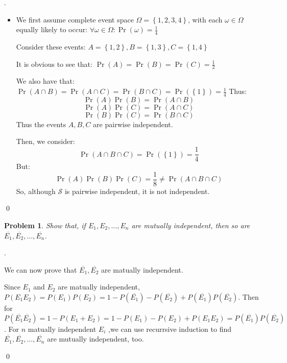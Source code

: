 \documentclass[12pt]{article}
\newtheorem{hw}{Problem}
\newenvironment{sol}
  {\par\vspace{3mm}\noindent{\it Solution}.}
  {\qed}
\begin{document}
\begin{sol}\par
\renewcommand{\qedsymbol}{}
\begin{itemize}
\item We first assume complete event space $\Omega = \left\{{1, 2, 3, 4}\right\}$, with each $\omega \in \Omega$ equally likely to occur:
$\forall \omega \in \Omega: \Pr \left({\omega}\right) = \frac{1}{4}$\par
Consider these events:
$A = \left\{{1, 2}\right\}, B = \left\{{1, 3}\right\}, C = \left\{{1, 4}\right\}$\par
It is obvious to see that:
$\Pr \left({A}\right) = \Pr \left({B}\right) = \Pr \left({C}\right) = \frac{1}{2}$\par
We also have that:
$\Pr \left({A \cap B}\right) = \Pr \left({A \cap C}\right) = \Pr \left({B \cap C}\right) = \Pr \left({\left\{{1}\right\}}\right) = \frac{1}{4}$
Thus:
$$\Pr \left({A}\right) \Pr \left({B}\right) = \Pr \left({A \cap B}\right)$$
$$\Pr \left({A}\right) \Pr \left({C}\right) = \Pr \left({A \cap C}\right)$$
$$\Pr \left({B}\right) \Pr \left({C}\right) = \Pr \left({B \cap C}\right)$$
Thus the events $A, B, C$ are pairwise independent.\par
Then, we consider:
$$\Pr \left({A \cap B \cap C}\right) = \Pr \left({\left\{{1}\right\}}\right) = \frac{1}{4}$$
But:
$$\Pr \left({A}\right) \Pr \left({B}\right) \Pr \left({C}\right) = \dfrac{1}{8} \ne \Pr \left({A \cap B \cap C}\right)$$
So, although $\mathcal S$ is pairwise independent, it is not independent.
\end{itemize}
\end{sol}

\begin{hw}
Show that, if $E_1, E_2, \ldots, E_n$ are mutually independent, then so are $\overline{E_1}, \overline{E_2},\ldots, \overline{E_n}$.
\end{hw}

\begin{sol}\par
\renewcommand{\qedsymbol}{}
We can now prove that $\overline{E_1}, \overline{E_2}$ are matually independent.\par
Since $E_1$ and $E_2$ are matually independent, $P(E_1E_2) = P(E_1)P(E_2) = 1 - P(\overline{E_1}) - P(\overline{E_2}) + P(\overline{E_1})P(\overline{E_2})$. Then for $P(\overline{E_1}\overline{E_2}) = 1 - P(E_1+E_2) = 1-P(E_1)-P(E_2)+P(E_1E_2)=P(\overline{E_1})P(\overline{E_2})$. For $n$ matually independent $E_i$ ,we can use recurrsive induction to find $\overline{E_1}, \overline{E_2}, \ldots, \overline{E_n}$ are mutually independent, too.

\end{sol}
\end{document}
